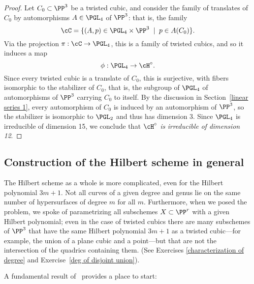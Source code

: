 \begin{proof}  Let $C_0 \subset \PP^3$ be a twisted cubic, and consider the family of translates of $C_0$ by automorphisms $A \in \PGL_4$ of $\PP^3$: that is, the family
$$
\cC = \{ (A, p) \in \PGL_4 \times \PP^3 \; \mid \; p \in A(C_0) \}.
$$
Via the projection $\pi : \cC \to \PGL_4$, this is a family of twisted cubics, and so it induces a map
$$
\phi : \PGL_4 \to \cH^\circ.
$$
Since every twisted cubic is a translate of $C_0$, this is surjective, with fibers isomorphic to the stabilizer of $C_0$, that is, the subgroup of $\PGL_4$ of automorphisms of $\PP^3$ carrying $C_0$ to itself. By the discussion in Section~\ref{linear series 1}, every automorphism of $C_{0}$ is induced by an automorphism of $\PP^{3}$, so the stabilizer is isomorphic to $\PGL_2$ and  thus has dimension 3. Since $\PGL_4$ is irreducible of dimension 15, we conclude that \emph{$\cH^\circ$ is irreducible of dimension 12}.
\end{proof}


\subsection{Construction of the Hilbert scheme in general}

The Hilbert scheme as a whole is more complicated, even for the Hilbert polynomial $3m+1$. Not all curves of a given degree and genus lie on the same number of hypersurfaces of degree $m$ for all $m$. Furthermore, when we posed the problem, we spoke of parametrizing all subschemes $X \subset \PP^r$ with a given Hilbert polynomial; even in the case of twisted cubics there are many subschemes of $\PP^3$ that have the same Hilbert polynomial $3m+1$ as a twisted cubic---for example, the union of a plane cubic and a point---but that are not the intersection of the quadrics containing them. (See Exercises \ref{characterization of degree} and Exercise~\ref{deg of disjoint union}). 

A fundamental result of~\cite{Matsusaka} provides a place to start:

